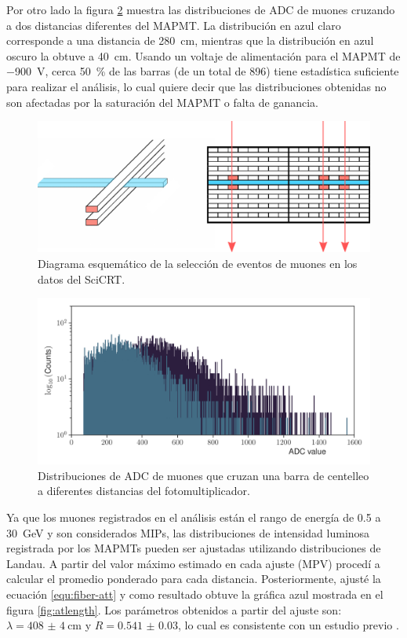 Por otro lado la figura \ref{fig:adc-distance} muestra las distribuciones de ADC de muones cruzando a dos distancias diferentes del MAPMT. La distribución en azul claro corresponde a una distancia de \SI{280}{\cm}, mientras que la distribución en azul oscuro la obtuve a \SI{40}{\cm}. Usando un voltaje de alimentación para el MAPMT de \SI{-900}{\volt}, cerca \SI{50}{\percent} de las barras (de un total de \num{896}) tiene estadística suficiente para realizar el análisis, lo cual quiere decir que las distribuciones obtenidas no son afectadas por la saturación del MAPMT o falta de ganancia.

\begin{figure}
        \centering
        \includegraphics[width=\textwidth]{muon-attenuation.pdf}
        \caption{Diagrama esquemático de la selección de eventos de muones en los datos del SciCRT.}
        \label{fig:muon-selection}
\end{figure}

\begin{figure}
        \centering
        \includegraphics[width=\textwidth]{adc_attenuation.pdf}
        \caption{Distribuciones de ADC de muones que cruzan una barra de centelleo a diferentes distancias del fotomultiplicador.}
        \label{fig:adc-distance}
\end{figure}

Ya que los muones registrados en el análisis están el rango de energía de \num{0.5} a \SI{30}{\giga\electronvolt} y son considerados MIPs, las distribuciones de intensidad luminosa registrada por los MAPMTs pueden ser ajustadas utilizando distribuciones de Landau. A partir del valor máximo estimado en cada ajuste (MPV) procedí a calcular el promedio ponderado para cada distancia. Posteriormente, ajusté la ecuación \ref{equ:fiber-att} y como resultado obtuve la gráfica azul mostrada en el figura \ref{fig:atlength}. Los parámetros obtenidos a partir del ajuste son: $\lambda=\SI{408(4)}{\cm}$ y $R=\num{0.541(30)}$, lo cual es consistente con un estudio previo \cite{itow13}.


